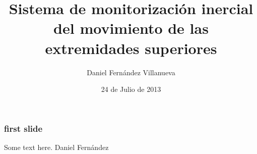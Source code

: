 \documentclass[12pt,a4paper]{beamer}
\author{Daniel Fernández Villanueva}
\title[]{Sistema de monitorización inercial del movimiento de las extremidades superiores}
\date{24 de Julio de 2013}
\institute{Escuela Politécnica de Ingeniería de Gijón}
\begin{document}
\begin{frame}
	\frametitle{}
\end{frame}

\begin{frame}
	\frametitle{first slide}
	Some text here.	
	Daniel Fernández
\end{frame}
\end{document}
